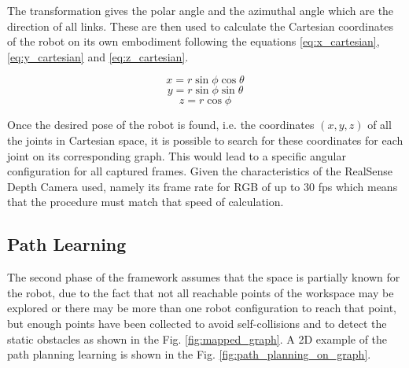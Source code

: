 \documentclass[thesis]{mas_proposal}
\begin{document}
	   	The transformation gives the polar angle and the azimuthal angle which are the direction of all links. These are then used to calculate the Cartesian coordinates of the robot on its own embodiment following the equations \ref{eq:x_cartesian}, \ref{eq:y_cartesian} and \ref{eq:z_cartesian}. 
   	
	   	\begin{equation}
	   	x = r \sin \phi \cos \theta
	   	\label{eq:x_cartesian}
	   	\end{equation}
	   	\begin{equation}
	   	y = r \sin \phi \sin \theta
	   	\label{eq:y_cartesian}
	   	\end{equation}
	   	\begin{equation}
	   	z = r \cos \phi
	   	\label{eq:z_cartesian}
	   	\end{equation}
	   	
	   	Once the desired pose of the robot is found, i.e. the coordinates $(x,y,z)$ of all the joints in Cartesian space, it is possible to search for these coordinates for each joint on its corresponding graph. This would lead to a specific angular configuration for all captured frames. Given the characteristics of the RealSense Depth Camera used, namely its frame rate for RGB of up to 30 fps \cite{realsense_manual} which means that the procedure must match that speed of calculation. 
   	
   	\subsection{Path Learning}
   	
	The second phase of the framework assumes that the space is partially known for the robot, due to the fact that not all reachable points of the workspace may be explored or there may be more than one robot configuration to reach that point, but enough points have been collected to avoid self-collisions and to detect the static obstacles as shown in the Fig. \ref{fig:mapped_graph}. A 2D example of the path planning learning is shown in the Fig. \ref{fig:path_planning_on_graph}. 
	
\end{document}

